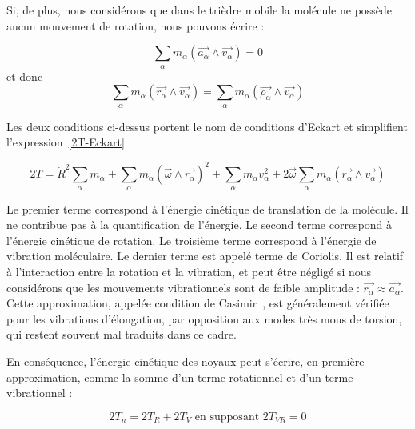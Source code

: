 Si, de plus, nous considérons que dans le trièdre mobile la molécule ne possède aucun mouvement de rotation, nous pouvons écrire :

\begin{equation}
\sum_{\alpha}m_{\alpha}\left(\stackrel{\rightarrow}{a_{\alpha}} \wedge \stackrel{\rightarrow}{v_{\alpha}}\right) = 0
\end{equation}
\noindent et donc
\begin{equation}
\sum_{\alpha}m_{\alpha}\left(\stackrel{\rightarrow}{r_{\alpha}} \wedge \stackrel{\rightarrow}{v_{\alpha}}\right) = \sum_{\alpha}m_{\alpha}\left(\stackrel{\rightarrow}{\rho_{\alpha}} \wedge \stackrel{\rightarrow}{v_{\alpha}}\right)
\end{equation}

Les deux conditions ci-dessus portent le nom de conditions d'Eckart et simplifient l'expression~\ref{2T-Eckart} :

\begin{equation}
2T = \dot{R}^2\sum_{\alpha}m_{\alpha} + \sum_{\alpha}m_{\alpha}\left(\stackrel{\rightarrow}{\omega} \wedge \stackrel{\rightarrow}{r_{\alpha}}\right)^2 + \sum_{\alpha}m_{\alpha}v^2_{\alpha} + 2\stackrel{\rightarrow}{\omega}\sum_{\alpha}m_{\alpha}\left(\stackrel{\rightarrow}{r_{\alpha}} \wedge \stackrel{\rightarrow}{v_{\alpha}}\right)
\end{equation}

Le premier terme correspond à l'énergie cinétique de translation de la molécule. Il ne contribue pas à la quantification de l'énergie. Le second terme correspond  à l'énergie cinétique de rotation. Le troisième terme correspond à l'énergie de vibration moléculaire. Le dernier terme est appelé terme de Coriolis. Il est relatif à l'interaction entre la rotation et la vibration, et peut être négligé si nous considérons que les mouvements vibrationnels sont de faible amplitude : $\stackrel{\rightarrow}{r_{\alpha}} \approx \stackrel{\rightarrow}{a_{\alpha}}$. Cette approximation,  appelée condition de Casimir~\cite{casimir1931rotation}, est généralement vérifiée pour les vibrations d'élongation, par opposition aux modes très mous de torsion, qui restent souvent mal traduits dans ce cadre.

En conséquence, l'énergie cinétique des noyaux peut s'écrire, en première approximation, comme la somme d'un terme rotationnel et d'un terme vibrationnel :

\begin{equation}
2T_n = 2T_R + 2 T_V \text{ en supposant }2T_{VR} = 0
\end{equation}

